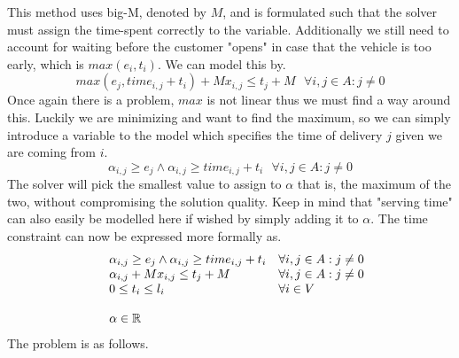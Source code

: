 \documentclass{article}
\begin{document}
    This method uses big-M, denoted by $M$, and is formulated such that the solver must assign the time-spent correctly to the variable.
    Additionally we still need to account for waiting before the customer "opens" in case that the vehicle is too early, which is $max(e_i, t_i)$.
    We can model this by.
    \[
        max(e_j, time_{i,j} + t_i) + Mx_{i,j} \leq t_j + M \,\,\,\, \forall i,j \in A: j \neq 0
    \]
    Once again there is a problem, $max$ is not linear thus we must find a way around this.
    Luckily we are minimizing and want to find the maximum, so we can simply introduce a variable to the model which specifies the time of delivery $j$ given we are coming from $i$.
    \[
        \alpha_{i,j} \geq e_j \land \alpha_{i,j} \geq time_{i,j} + t_i \,\,\,\, \forall i,j \in A: j \neq 0
    \]
    The solver will pick the smallest value to assign to $\alpha$ that is, the maximum of the two, without compromising the solution quality.
    Keep in mind that "serving time" can also easily be modelled here if wished by simply adding it to $\alpha$.
    The time constraint can now be expressed more formally as.
    \begin{equation*}
        \begin{array}{ll@{}ll}
            & \displaystyle\alpha_{i,j} \geq e_j \land \alpha_{i,j} \geq time_{i,j} + t_i &&  \forall i,j \in A: j \neq 0\\
            & \displaystyle \alpha_{i,j} + Mx_{i,j} \leq t_j + M  && \forall i,j \in A: j \neq 0\\
            & \displaystyle0 \leq t_i \leq l_i &&  \forall i \in V\\\\
            & \displaystyle \alpha \in \mathbb{R} &&\\
        \end{array}
    \end{equation*}
    The problem is as follows.
\end{document}
